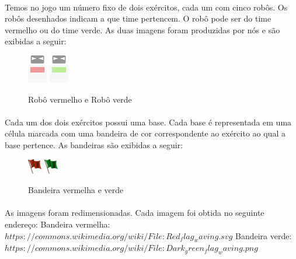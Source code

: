 \documentclass[a4paper]{article}
\begin{document}
 \paragraph{}
 Temos no jogo um número fixo de dois exércitos, cada um com cinco robôs. Os robôs desenhados indicam a que time pertencem. O robô pode ser do time vermelho ou do time verde. As duas imagens foram produzidas por nós e são exibidas a seguir:
 
 \begin{figure}[h]
 \begin{center}
 \includegraphics[scale=0.8]{rr.png}
 \includegraphics[scale=0.8]{rg.png}
 \caption{Robô vermelho e Robô verde}
 \label{fig:rbot}
 \end{center} 
 \end{figure}
 
 \paragraph{}
 Cada um dos dois exércitos possui uma base. Cada base é representada em uma célula marcada com uma bandeira de cor correspondente ao exército ao qual a base pertence. As bandeiras são exibidas a seguir:
 
 \begin{figure}[h]
 \begin{center}
 \includegraphics[scale=0.8]{rf.png}
 \includegraphics[scale=0.8]{gf.png}
 \caption{Bandeira vermelha e verde}
 \label{fig:flags}
 \end{center} 
 \end{figure}
 
 \paragraph{}
 As imagens foram redimensionadas. Cada imagem foi obtida no seguinte endereço:
Bandeira vermelha: $https://commons.wikimedia.org/wiki/File:Red_flag_waving.svg$
Bandeira verde:
$https://commons.wikimedia.org/wiki/File:Dark_green_flag_waving.png$

 
\end{document}
